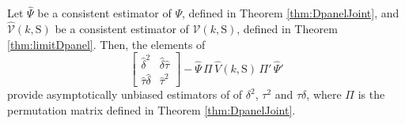 \begin{cor}
  Let $\widehat{\Psi}$ be a consistent estimator of $\Psi$, defined in Theorem \ref{thm:DpanelJoint}, and $\widehat{\mathcal{V}}(k,\text{S})$ be a consistent estimator of $\mathcal{V}(k,\text{S})$, defined in Theorem \ref{thm:limitDpanel}.
  Then, the elements of  
  \[
    \left[
    \begin{array}{cc}
      \widehat{\delta}^2 & \widehat{\delta} \widehat{\tau} \\
      \widehat{\tau} \widehat{\delta} & \widehat{\tau}^2
    \end{array}
  \right] - \widehat{\Psi}\, \Pi \, \widehat{V}(k,\text{S}) \, \Pi' \, \widehat{\Psi}'
  \]
  provide asymptotically unbiased estimators of of $\delta^2$, $\tau^2$ and $\tau\delta$, where $\Pi$ is the permutation matrix defined in Theorem \ref{thm:DpanelJoint}.
\end{cor}

